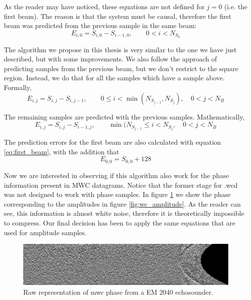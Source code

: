 As the reader may have noticed, these equations are not defined for $j=0$ (i.e. the first beam). The reason is that the system must be causal, therefore the first beam was predicted from the previous sample in the same beam:
\begin{equation} \label{eq:first_beam}
E_{i,0} = S_{i,0} - S_{i-1,0}, \qquad 0 < i < N_{S_0}
\end{equation}

The algorithm we propose in this thesis is very similar to the one we have just described, but with some improvements. We also follow the approach of predicting samples from the previous beam, but we don't restrict to the square region. Instead, we do that for all the samples which have a sample above. Formally,
\begin{equation}
E_{i,j} = S_{i,j} - S_{i,j-1}, \qquad 0 \leq i < \min(N_{S_{j-1}}, N_{S_j}), \quad 0 < j < N_B
\end{equation}

The remaining samples are predicted with the previous samples. Mathematically,
\begin{equation}
E_{i,j} = S_{i,j} - S_{i-1,j}, \qquad \min(N_{S_{j-1}} \leq i < N_{S_j}, \quad 0 < j < N_B
\end{equation}

The prediction errors for the first beam are also calculated with equation \ref{eq:first_beam}, with the addition that
\begin{equation}
E_{0,0} = S_{0,0} + 128
\end{equation}

Now we are interested in observing if this algorithm also work for the phase information present in MWC datagrams. Notice that the former stage for .wcd was not designed to work with phase samples. In figure \ref{fig:wc_phase} we show the phase corresponding to the amplitudes in figure \ref{fig:wc_amplitude}. As the reader can see, this information is almost white noise, therefore it is theoretically impossible to compress. Our final decision has been to apply the same equations that are used for amplitude samples.
\begin{figure}[h!]
	\begin{center}
		\includegraphics[scale=0.334]{images/water_column_ph.png}
	\end{center}
	\caption{Raw representation of \acrshort{mwc} phase from a EM 2040 echosounder.}
	\label{fig:wc_phase}
\end{figure}

